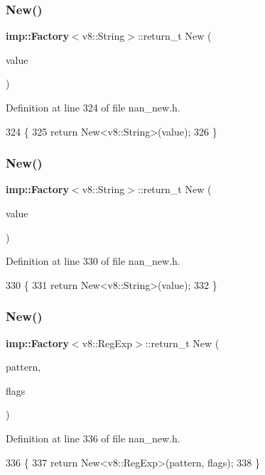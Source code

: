 \subsubsection{New()\hspace{0.1cm}{\footnotesize\ttfamily [20/22]}}
{\footnotesize\ttfamily \textbf{ imp\+::\+Factory}$<$v8\+::\+String$>$\+::return\+\_\+t New (\begin{DoxyParamCaption}\item[{v8\+::\+String\+::\+External\+String\+Resource $\ast$}]{value }\end{DoxyParamCaption})}



Definition at line 324 of file nan\+\_\+new.\+h.


\begin{DoxyCode}
324                                             \{
325   \textcolor{keywordflow}{return} New<v8::String>(value);
326 \}
\end{DoxyCode}
\mbox{\label{nan__new_8h_abccb9a83edac5d72a4c7935f1e31d6b5}} 
\subsubsection{New()\hspace{0.1cm}{\footnotesize\ttfamily [21/22]}}
{\footnotesize\ttfamily \textbf{ imp\+::\+Factory}$<$v8\+::\+String$>$\+::return\+\_\+t New (\begin{DoxyParamCaption}\item[{External\+One\+Byte\+String\+Resource $\ast$}]{value }\end{DoxyParamCaption})}



Definition at line 330 of file nan\+\_\+new.\+h.


\begin{DoxyCode}
330                                            \{
331   \textcolor{keywordflow}{return} New<v8::String>(value);
332 \}
\end{DoxyCode}
\mbox{\label{nan__new_8h_a74d3507cdae70f2cdd6e7ca576e2462e}} 
\subsubsection{New()\hspace{0.1cm}{\footnotesize\ttfamily [22/22]}}
{\footnotesize\ttfamily \textbf{ imp\+::\+Factory}$<$v8\+::\+Reg\+Exp$>$\+::return\+\_\+t New (\begin{DoxyParamCaption}\item[{v8\+::\+Local$<$ v8\+::\+String $>$}]{pattern,  }\item[{v8\+::\+Reg\+Exp\+::\+Flags}]{flags }\end{DoxyParamCaption})}



Definition at line 336 of file nan\+\_\+new.\+h.


\begin{DoxyCode}
336                                                     \{
337   \textcolor{keywordflow}{return} New<v8::RegExp>(pattern, flags);
338 \}
\end{DoxyCode}
